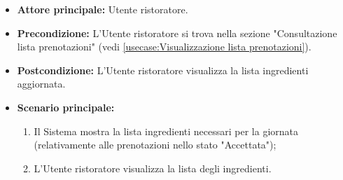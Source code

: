\label{usecase:Consultazione lista ingredienti}
\begin{itemize}

	\item \textbf{Attore principale:} Utente ristoratore.

	\item \textbf{Precondizione:} L'Utente ristoratore si trova nella sezione "Consultazione lista prenotazioni" (vedi \autoref{usecase:Visualizzazione lista prenotazioni}).

	\item \textbf{Postcondizione:} L'Utente ristoratore visualizza la lista ingredienti aggiornata.

	\item \textbf{Scenario principale:}
	\begin{enumerate}
		\item Il Sistema mostra la lista ingredienti necessari per la giornata (relativamente alle prenotazioni nello stato "Accettata");
		\item L'Utente ristoratore visualizza la lista degli ingredienti.
	\end{enumerate}

\end{itemize}

